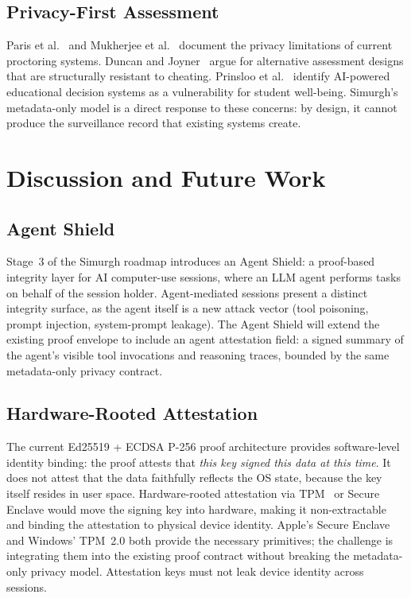 \documentclass[conference]{IEEEtran}
\begin{document}
\subsection{Privacy-First Assessment}

Paris et al.~\cite{paris2021sins} and Mukherjee et al.~\cite{mukherjee2024balancing} document the privacy limitations of current proctoring systems. Duncan and Joyner~\cite{duncan2022necessity} argue for alternative assessment designs that are structurally resistant to cheating. Prinsloo et al.~\cite{prinsloo2024vulnerable} identify AI-powered educational decision systems as a vulnerability for student well-being. Simurgh's metadata-only model is a direct response to these concerns: by design, it cannot produce the surveillance record that existing systems create.

\section{Discussion and Future Work}

\subsection{Agent Shield}

Stage~3 of the Simurgh roadmap introduces an Agent Shield: a proof-based integrity layer for AI computer-use sessions, where an LLM agent performs tasks on behalf of the session holder. Agent-mediated sessions present a distinct integrity surface, as the agent itself is a new attack vector (tool poisoning, prompt injection, system-prompt leakage). The Agent Shield will extend the existing proof envelope to include an agent attestation field: a signed summary of the agent's visible tool invocations and reasoning traces, bounded by the same metadata-only privacy contract.

\subsection{Hardware-Rooted Attestation}

The current Ed25519 + ECDSA P-256 proof architecture provides software-level identity binding: the proof attests that \textit{this key signed this data at this time}. It does not attest that the data faithfully reflects the OS state, because the key itself resides in user space. Hardware-rooted attestation via TPM~\cite{tpm2spec} or Secure Enclave would move the signing key into hardware, making it non-extractable and binding the attestation to physical device identity. Apple's Secure Enclave and Windows' TPM~2.0 both provide the necessary primitives; the challenge is integrating them into the existing proof contract without breaking the metadata-only privacy model. Attestation keys must not leak device identity across sessions.
\end{document}
